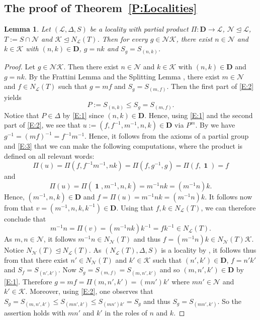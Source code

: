 \documentclass[reqno,11pt]{amsart}
\numberwithin{equation}{section}
\newtheorem{lemma}[theorem]{Lemma}
\theoremstyle{definition}
\renewcommand{\L}{\mathcal{L}}
\newcommand{\N}{\mathcal{N}}
\newcommand{\K}{\mathcal{K}}
\newcommand{\D}{\mathbf{D}}
\newcommand{\One}{\operatorname{\mathbf{1}}}
\begin{document}
\subsection{The proof of Theorem~\ref{P:Localities}}

\begin{lemma}\label{L:Decompose}
Let $(\L,\Delta,S)$ be a locality with partial product $\Pi\colon\D\rightarrow\L$, $\N\unlhd\L$, $T:=S\cap\N$ and $\K\unlhd N_\L(T)$. Then for every $g\in\N\K$, there exist $n\in\N$ and $k\in\K$ with $(n,k)\in\D$, $g=nk$ and $S_g=S_{(n,k)}$.
\end{lemma}

\begin{proof}
Let $g\in\N\K$. Then there exist $n\in\N$ and $k\in\K$ with $(n,k)\in\D$ and $g=nk$. By the Frattini Lemma and the Splitting Lemma \cite[Corollary~3.11, Lemma~3.12]{Chermak:2015}, there exist $m\in\N$ and $f\in N_\L(T)$ such that $g=mf$ and $S_g=S_{(m,f)}$. Then the first part of \eqref{E:2} yields
\[P:=S_{(n,k)}\leq S_g=S_{(m,f)}.\]
Notice that $P\in\Delta$ by \eqref{E:1} since $(n,k)\in\D$. Hence, using \eqref{E:1} and the second part of \eqref{E:2}, we see that  $u:=(f,f^{-1},m^{-1},n,k)\in\D$ via $P^m$. By \cite[Lemma~1.4(f)]{Chermak:2015} we have $g^{-1}=(mf)^{-1}=f^{-1}m^{-1}$. Hence, it follows from the axioms of a partial group and \eqref{E:3} that we can make the following computations, where the product is defined on all relevant words: 
\[\Pi(u)=\Pi(f,f^{-1}m^{-1},nk)=\Pi(f,g^{-1},g)=\Pi(f,\One)=f\]
and
\[\Pi(u)=\Pi(\One,m^{-1},n,k)=m^{-1}nk=(m^{-1}n)k.\]
Hence, $(m^{-1},n,k)\in\D$ and $f=\Pi(u)=m^{-1}nk=(m^{-1}n)k$. It follows now from \cite[Lemma~1.4(d)]{Chermak:2015} that $v=(m^{-1},n,k,k^{-1})\in\D$. Using that $f,k\in N_\L(T)$, we can therefore conclude that 
\[m^{-1}n=\Pi(v)=(m^{-1}nk)k^{-1}=fk^{-1}\in N_\L(T).\]
As $m,n\in\N$, it follows $m^{-1}n\in N_\N(T)$ and thus $f=(m^{-1}n)k\in N_\N(T)\K$. Notice $N_\N(T)\unlhd N_\L(T)$. As $(N_\L(T),\Delta,S)$ is a locality by \cite[Lemma~2.12]{Chermak:2015}, it follows thus from \cite[Theorem~1]{Henke:2015a} that there exist $n'\in N_\N(T)$ and $k'\in\K$ such that $(n',k')\in\D$, $f=n'k'$ and $S_f=S_{(n',k')}$. Now $S_g=S_{(m,f)}=S_{(m,n',k')}$ and so $(m,n',k')\in\D$ by \eqref{E:1}. Therefore $g=mf=\Pi(m,n',k')=(mn')k'$ where $mn'\in\N$ and $k'\in\K$. Moreover, using \eqref{E:2}, one observes that $S_g=S_{(m,n',k')}\leq S_{(mn',k')}\leq S_{(mn')k'}=S_g$ and thus $S_g=S_{(mn',k')}$. So the assertion holds with $mn'$ and $k'$ in the roles of $n$ and $k$.
\end{proof}
\end{document}
